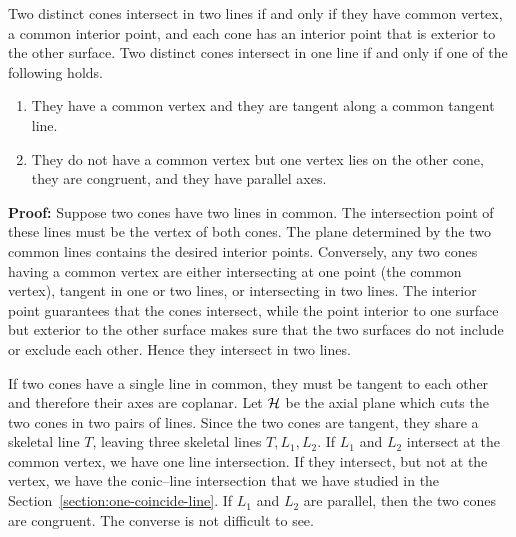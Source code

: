 \begin{lemma}
\label{lemma:cone-cone-linear}
     Two distinct cones intersect in two lines if and only if they have
common vertex, a common interior point, and each cone has an interior point
that is exterior to the other surface.  Two distinct cones intersect in one
line if and only if one of the following holds.
\begin{enumerate}
     \item They have a common vertex and they are tangent along a common
          tangent line.
     \item They do not have a common vertex but one vertex lies on the other
          cone, they are congruent, and they
          have parallel axes.
\end{enumerate}
\end{lemma}
{\bf Proof:} Suppose two cones have two lines in common.  The intersection 
point of these lines must be the vertex of both cones.  The plane
determined by the two common lines contains the desired interior points.
Conversely, any two cones having a common vertex are either intersecting at
one point (the common vertex), tangent
in one or two lines, or intersecting in two lines.  The interior point 
guarantees that the cones intersect, while the point interior to one surface
but exterior to the other surface makes sure that the two surfaces do not 
include or exclude each other.  Hence they intersect in two lines.

     If two cones have a single line in common, they must be tangent to each 
other and therefore their axes are coplanar.  Let ${\cal H}$ be the axial
plane which cuts the two cones in two pairs of lines.  Since the two cones are
tangent, they share a skeletal line $T$, leaving three skeletal lines 
$T,L_1,L_2$.  If $L_1$ and $L_2$ intersect at the common vertex, we have one 
line intersection.  If they intersect, but not at the vertex, we have the 
conic--line intersection that we have studied in the 
Section~\ref{section:one-coincide-line}.  If $L_1$ and $L_2$
are parallel, then the two cones are congruent.  The converse is not difficult
to see.\ \ \ \QED

